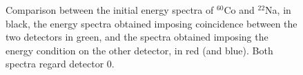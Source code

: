\begin{figure}[H]
	\begin{minipage}[c]{0.5\linewidth}
	\end{minipage}
	\begin{minipage}[]{0.5\linewidth}
	\centering
	\end{minipage}
	\caption{Comparison between the initial energy spectra of $^{60}$Co and $^{22}$Na, in black, the energy spectra obtained imposing coincidence between the two detectors in green, and the spectra obtained imposing the energy condition on the other detector, in red (and blue). Both spectra regard detector 0.}
    \label{fig:coinc_spectra_all}
	\end{figure}

